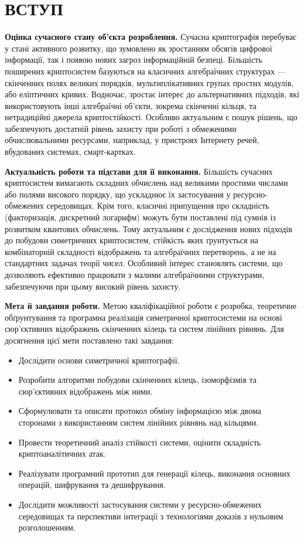 \chapter*{ВСТУП}
{}

\textbf{Оцінка сучасного стану об’єкта розроблення.}
Сучасна криптографія перебуває у стані активного розвитку, що зумовлено як зростанням обсягів цифрової інформації, так і появою нових загроз інформаційній безпеці.
Більшість поширених криптосистем базуються на класичних алгебраїчних структурах — скінченних полях великих порядків, мультиплікативних групах простих модулів, або еліптичних кривих.
Водночас, зростає інтерес до альтернативних підходів, які використовують інші алгебраїчні об’єкти, зокрема скінченні кільця, та нетрадиційні джерела криптостійкості.
Особливо актуальним є пошук рішень, що забезпечують достатній рівень захисту при роботі з обмеженими обчислювальними ресурсами, наприклад, у пристроях Інтернету речей, вбудованих системах, смарт-картках.

\textbf{Актуальність роботи та підстави для її виконання.}
Більшість сучасних криптосистем вимагають складних обчислень над великими простими числами або полями високого порядку, що ускладнює їх застосування у ресурсно-обмежених середовищах.
Крім того, класичні припущення про складність (факторизація, дискретний логарифм) можуть бути поставлені під сумнів із розвитком квантових обчислень.
Тому актуальним є дослідження нових підходів до побудови симетричних криптосистем, стійкість яких ґрунтується на комбінаторній складності відображень та алгебраїчних перетворень, а не на стандартних задачах теорії чисел.
Особливий інтерес становлять системи, що дозволяють ефективно працювати з малими алгебраїчними структурами, забезпечуючи при цьому високий рівень захисту.

\textbf{Мета й завдання роботи.}
Метою кваліфікаційної роботи є розробка, теоретичне обґрунтування та програмна реалізація симетричної криптосистеми на основі сюр’єктивних відображень скінченних кілець та систем лінійних рівнянь.
Для досягнення цієї мети поставлено такі завдання:
\begin{itemize}
    \item Дослідити основи симетричної криптографії.
    \item Розробити алгоритми побудови скінченних кілець, ізоморфізмів та сюр’єктивних відображень між ними.
    \item Сформулювати та описати протокол обміну інформацією між двома сторонами з використанням систем лінійних рівнянь над кільцями.
    \item Провести теоретичний аналіз стійкості системи, оцінити складність криптоаналітичних атак.
    \item Реалізувати програмний прототип для генерації кілець, виконання основних операцій, шифрування та дешифрування.
    \item Дослідити можливості застосування системи у ресурсно-обмежених середовищах та перспективи інтеграції з технологіями доказів з нульовим розголошенням.
\end{itemize}

